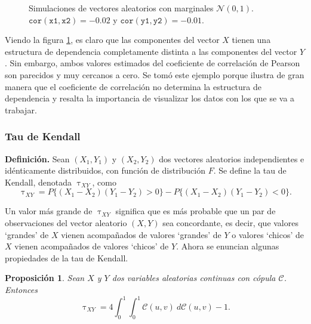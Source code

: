 \documentclass[11pt,a4paper]{article}
\newcommand{\C}{\mathcal{C}}
\newtheorem{proposition}{Proposición}[subsection]
\begin{document}
\begin{figure}[h]
    \caption{Simulaciones de vectores aleatorios con marginales $\mathcal{N}(0, 1)$. $\mathtt{cor(x1, x2)} = -0.02$ y $\mathtt{cor(y1, y2)} = -0.01$.}
    \label{fig:panel_corr}
\end{figure}

Viendo la figura \ref{fig:panel_corr}, es claro que las componentes del vector $X$ tienen una estructura de dependencia completamente distinta a las componentes del vector $Y$. Sin embargo, ambos valores estimados del coeficiente de correlación de Pearson son parecidos y muy cercanos a cero. Se tomó este ejemplo porque ilustra de gran manera que el coeficiente de correlación no determina la estructura de dependencia y resalta la importancia de visualizar los datos con los que se va a trabajar.\\

\subsubsection*{Tau de Kendall}
\textbf{Definición.} Sean $(X_1, Y_1)$ y $(X_2, Y_2)$ dos vectores aleatorios independientes e idénticamente distribuidos, con función de distribución $F$. Se define la tau de Kendall, denotada $\uptau_{XY}$, como $$\uptau_{XY} = P\{(X_1-X_2)(Y_1-Y_2)>0\} - P\{(X_1-X_2)(Y_1-Y_2)<0\}.$$

Un valor más grande de $\uptau_{XY}$ significa que es más probable que un par de observaciones del vector aleatorio $(X, Y)$ sea concordante, es decir, que valores `grandes' de $X$ vienen acompañados de valores `grandes' de $Y$ o valores `chicos' de $X$ vienen acompañados de valores `chicos' de $Y$. Ahora se enuncian algunas propiedades de la tau de Kendall.\\

\begin{proposition}
Sean $X$ y $Y$ dos variables aleatorias continuas con cópula $\C$. Entonces
$$\uptau_{XY} = 4\int_{0}^1\int_{0}^1\C(u, v) \ d\C(u, v) - 1.$$ 
\end{proposition}
\end{document}
